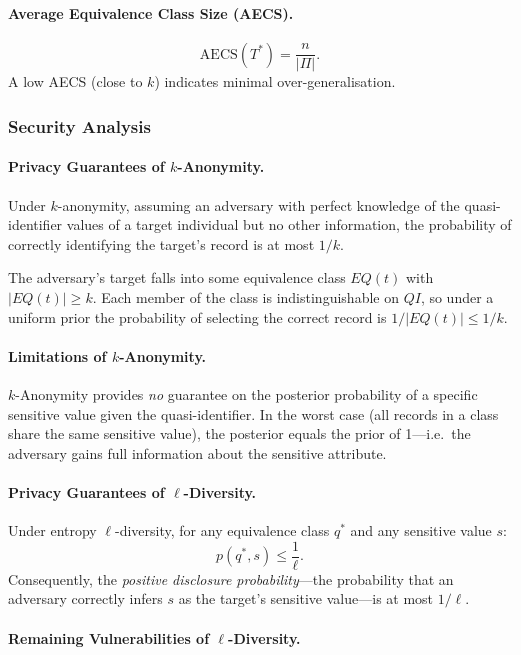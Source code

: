 \paragraph{Average Equivalence Class Size (AECS).}
\[
  \mathrm{AECS}(T^*) = \frac{n}{|\Pi|}.
\]
A low AECS (close to $k$) indicates minimal over-generalisation.

\subsubsection{Security Analysis}
\label{sec:security_analysis}

\paragraph{Privacy Guarantees of $k$-Anonymity.}
Under $k$-anonymity, assuming an adversary with perfect knowledge of the quasi-identifier values of a target individual but no other information, the probability of correctly identifying the target's record is at most $1/k$.

The adversary's target falls into some equivalence class $EQ(t)$ with $|EQ(t)| \geq k$. Each member of the class is indistinguishable on $QI$, so under a uniform prior the probability of selecting the correct record is $1/|EQ(t)| \leq 1/k$.

\paragraph{Limitations of $k$-Anonymity.}
$k$-Anonymity provides \emph{no} guarantee on the posterior probability of a specific sensitive value given the quasi-identifier. In the worst case (all records in a class share the same sensitive value), the posterior equals the prior of 1---i.e.\ the adversary gains full information about the sensitive attribute.

\paragraph{Privacy Guarantees of $\ell$-Diversity.}
Under entropy $\ell$-diversity, for any equivalence class $q^*$ and any sensitive value $s$:
\[
  p(q^*, s) \leq \frac{1}{\ell}.
\]
Consequently, the \emph{positive disclosure probability}---the probability that an adversary correctly infers $s$ as the target's sensitive value---is at most $1/\ell$.

\paragraph{Remaining Vulnerabilities of $\ell$-Diversity.}

